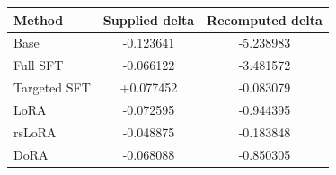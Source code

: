 \begingroup
\fontsize{7}{8.4}\selectfont
\setlength{\tabcolsep}{3pt}
\begin{tabular}{lcc}
\toprule
\textbf{Method} & \textbf{Supplied delta} & \textbf{Recomputed delta} \\
\midrule
Base & -0.123641 & -5.238983 \\
Full SFT & -0.066122 & -3.481572 \\
Targeted SFT & +0.077452 & -0.083079 \\
LoRA & -0.072595 & -0.944395 \\
rsLoRA & -0.048875 & -0.183848 \\
DoRA & -0.068088 & -0.850305 \\
\bottomrule
\end{tabular}
\endgroup
